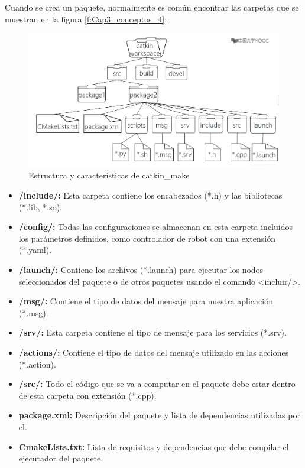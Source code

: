                \newpage


            Cuando se crea un paquete, normalmente es común encontrar las carpetas que se muestran en la figura \eqref{f:Cap3_conceptos_4}:
            
            \begin{figure}[htb]
                \centering
                \includegraphics[width=1.0\linewidth]{Main/Chapter3/Images3/n_s_a_4.png}
                \caption{Estructura y características de catkin\_make \cite{cmake_blogcsdn}}
                \label{f:Cap3_conceptos_4}
            \end{figure} 

            \begin{itemize}
                \item {\textbf{/include/:} Esta carpeta contiene los encabezados (*.h) y las bibliotecas (*.lib, *.so).}
                \item {\textbf{/config/:} Todas las configuraciones se almacenan en esta carpeta incluidos los parámetros definidos, como controlador de robot con una extensión (*.yaml).}
                \item {\textbf{/launch/:} Contiene los archivos (*.launch) para ejecutar los nodos seleccionados del paquete o de otros paquetes usando el comando <incluir/>.}
                \item {\textbf{/msg/:} Contiene el tipo de datos del mensaje para nuestra aplicación (*.msg).}
                \item {\textbf{/srv/:} Esta carpeta contiene el tipo de mensaje para los servicios (*.srv).}
                \item {\textbf{/actions/:} Contiene el tipo de datos del mensaje utilizado en las acciones (*.action). }
                \item {\textbf{/src/:} Todo el código que se va a computar en el paquete debe estar dentro de esta carpeta con extensión (*.cpp).}
                \item {\textbf{package.xml:} Descripción del paquete y lista de dependencias utilizadas por el.}
                \item {\textbf{CmakeLists.txt:} Lista de requisitos y dependencias que debe compilar el ejecutador del paquete.}
            \end{itemize}

